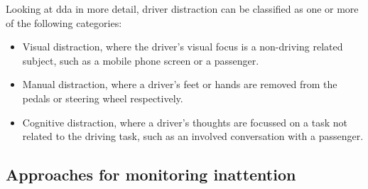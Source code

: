 \documentclass[11pt, parskip=half*,twoside=false]{scrbook}
\begin{document}
Looking at \gls{dda} in more detail, driver distraction can be classified as one or more of the following categories:
\begin{itemize}
	\item Visual distraction, where the driver's visual focus is a non-driving related subject, such as a mobile phone screen or a passenger.
	\item Manual distraction, where a driver's feet or hands are removed from the pedals or steering wheel respectively.
	\item Cognitive distraction, where a driver's thoughts are focussed on a task not related to the driving task, such as an involved conversation with a passenger.
\end{itemize}


\subsection{Approaches for monitoring inattention} \label{ssec:approaches}
%
\end{document}
